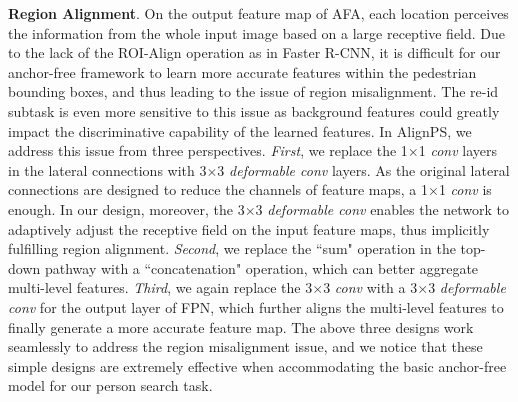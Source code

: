 \documentclass[journal]{IEEEtran}
\begin{document}
\textbf{Region Alignment}. On the output feature map of AFA, each location perceives the information from the whole input image based on a large receptive field. Due to the lack of the ROI-Align operation as in Faster R-CNN, it is difficult for our anchor-free framework to learn more accurate features within the pedestrian bounding boxes, and thus leading to the issue of region misalignment. The re-id subtask is even more sensitive to this issue as background features could greatly impact the discriminative capability of the learned features. In AlignPS, we address this issue from three perspectives. \emph{First}, we replace the 1$\times$1 \emph{conv} layers in the lateral connections with 3$\times$3 \emph{deformable conv} layers. As the original lateral connections are designed to reduce the channels of feature maps, a 1$\times$1 \emph{conv} is enough. In our design, moreover, the 3$\times$3 \emph{deformable conv} enables the network to adaptively adjust the receptive field on the input feature maps, thus implicitly fulfilling region alignment. \emph{Second}, we replace the ``sum" operation in the top-down pathway with a ``concatenation" operation, which can better aggregate multi-level features. \emph{Third}, we again replace the 3$\times$3 \emph{conv} with a 3$\times$3 \emph{deformable conv} for the output layer of FPN, which further aligns the multi-level features to finally generate a more accurate feature map. The above three designs work seamlessly to address the region misalignment issue, and we notice that these simple designs are extremely effective when accommodating the basic anchor-free model for our person search task.
\end{document}
